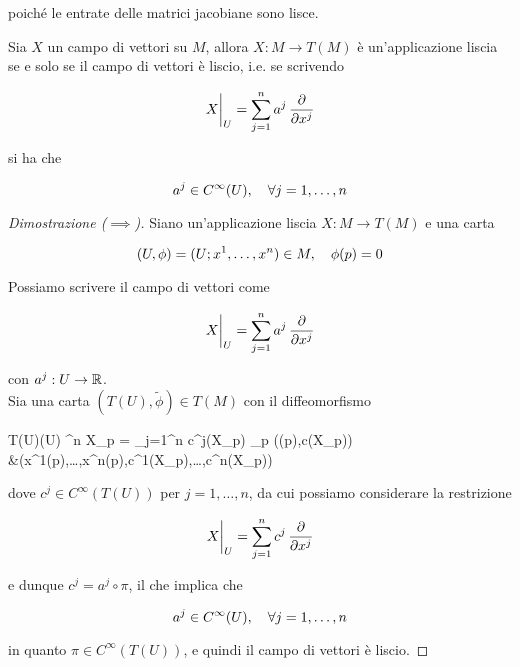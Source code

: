 poiché le entrate delle matrici jacobiane sono lisce.

\begin{definition}
	Sia $ X $ un campo di vettori su $ M $, allora $ X : M \to T(M) $ è un'applicazione liscia se e solo se il campo di vettori è liscio, i.e. se scrivendo
	
	\begin{equation}
		\eval{X}_{U} = \sum_{j=1}^{n} a^{j} \, \pdv{x^{j}}
	\end{equation}

	si ha che
	
	\begin{equation}
		a^{j} \in C^{\infty}(U) \qcomma \forall j=1,\dots,n
	\end{equation}
\end{definition}

\begin{proof}[Dimostrazione ($ \implies $)]
	Siano un'applicazione liscia $ X : M \to T(M) $ e una carta
	
	\begin{equation}
		(U,\phi) = (U; x^{1},\dots,x^{n}) \in M \qcomma \phi(p) = 0
	\end{equation}
	
	Possiamo scrivere il campo di vettori come
	
	\begin{equation}
		\eval{X}_{U} = \sum_{j=1}^{n} a^{j} \, \pdv{x^{j}}
	\end{equation}

	con $ a^{j} : U \to \mathbb{R} $.\\
	Sia una carta $ (T(U),\tilde{\phi}) \in T(M) $ con il diffeomorfismo
	
	\map{\tilde{\phi}}
		{T(U)}{\phi(U) \times \R^{n}}
		{%
			X_{p} = \sum_{j=1}^{n} c^{j}(X_{p}) _{p}
			}
		{%
			(\phi(p),c(X_{p})) \\
			&\mapsto (x^{1}(p),\dots,x^{n}(p),c^{1}(X_{p}),\dots,c^{n}(X_{p}))
			}

	dove $ c^{j} \in C^{\infty}(T(U)) $ per $ j=1,\dots,n $, da cui possiamo considerare la restrizione
	
	\begin{equation}
		\eval{X}_{U} = \sum_{j=1}^{n} c^{j} \, \pdv{x^{j}}
	\end{equation}

	e dunque $ c^{j} = a^{j} \circ \pi $, il che implica che
	
	\begin{equation}
		a^{j} \in C^{\infty}(U) \qcomma \forall j=1,\dots,n
	\end{equation}
	
	in quanto $ \pi \in C^{\infty}(T(U)) $, e quindi il campo di vettori è liscio.
\end{proof}

